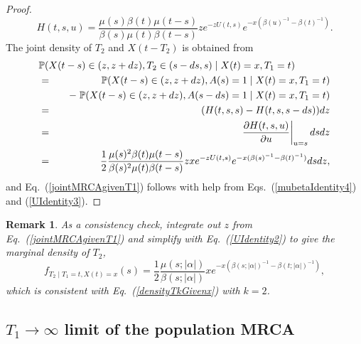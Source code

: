 \documentclass[preprint,12pt]{elsarticle}
\newtheorem{remark}{Remark}
\begin{document}
\begin{proof}
\[
H(t, s, u) = \frac{\mu(s)\beta(t)\mu(t - s)}{\beta(s)\mu(t)\beta(t - s)} ze^{-zU(t, s)} e^{-x(\beta(u)^{-1} - \beta(t)^{-1})}. 
\]
The joint density of $T_2$ and $X(t - T_2)$ is obtained from 
\begin{eqnarray*}
\lefteqn{\mathbb{P}(X(t - s) \in (z, z + dz), T_2 \in (s - ds, s) \mid X(t) = x, T_1 = t)}  \nonumber \\
	& = & \mathbb{P}(X(t - s) \in (z, z + dz), A(s) = 1 \mid X(t) = x, T_1 = t) \nonumber \\
	&&		\quad - \;\mathbb{P}(X(t - s) \in (z, z + dz), A(s - ds) = 1 \mid X(t) = x, T_1 = t) \nonumber \\
	& = & (H(t, s, s) - H(t, s, s - ds)) dz \nonumber \\
	& = & \left. \frac{\partial H(t, s, u)}{\partial u} \right|_{u = s} ds dz \nonumber \\
	& = & \frac{1}{2} \frac{\mu(s)^2\beta(t)\mu(t - s)}{\beta(s)^2\mu(t)\beta(t - s)} zxe^{-zU(t, s)} e^{-x(\beta(s)^{-1} - \beta(t)^{-1})} dsdz,  
\end{eqnarray*} 
and Eq.~(\ref{jointMRCAgivenT1}) follows with help from Eqs.~(\ref{mubetaIdentity4}) and (\ref{UIdentity3}).  
\end{proof}
\begin{remark}
As a consistency check, integrate out $z$ from Eq.~(\ref{jointMRCAgivenT1}) and simplify with Eq.~(\ref{UIdentity2}) to give the marginal density of $T_2$, 
\[
f_{T_2 \mid T_1=t, X(t) = x} (s) = \frac{1}{2} \frac{\mu(s; |\alpha|)}{\beta(s; |\alpha|)} x e^{-x(\beta(s; |\alpha|)^{-1} - \beta(t; |\alpha|)^{-1})},
\]
which is consistent with Eq.~(\ref{densityTkGivenx}) with $k = 2$.  
\end{remark}

%
%
\subsection{$T_1 \to \infty$ limit of the population MRCA}	
\label{sec:TInfLimitMRCA}
\end{document}
